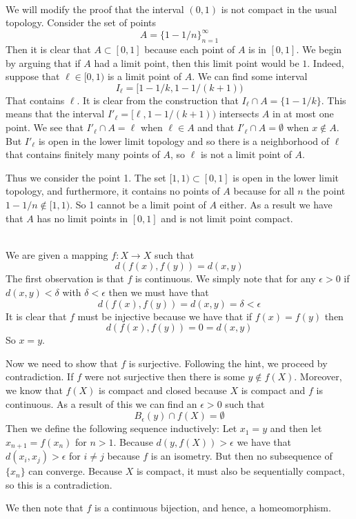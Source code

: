 \documentclass{article}
\newcommand{\problem}[1]{\noindent{\textbf{Problem #1}}\\}
\begin{document}
\problem{3.28.2}
We will modify the proof that the interval $(0,1)$ is not compact in the usual topology. Consider the set of points 
\[
A = \{1 - 1/n\}_{n=1}^\infty
\]
Then it is clear that $A \subset [0,1]$ because each point of $A$ is in $[0,1]$. We begin by arguing that if $A$ had a limit point, then this limit point would be $1$. Indeed, suppose that $\ell \in [0,1)$ is a limit point of $A$. We can find some interval 
\[
I_\ell = [1-1/k, 1-1/(k+1))
\]
That contains $\ell$. It is clear from the construction that $I_\ell \cap A = \{1-1/k\}$. This means that the interval $I'_\ell = [\ell, 1-1/(k+1))$ intersects $A$ in at most one point. We see that $I'_\ell \cap A = \ell$ when $\ell \in A$ and that $I'_\ell \cap A = \emptyset$ when $x\not\in A$. But $I'_\ell$ is open in the lower limit topology and so there is a neighborhood of $\ell$ that contains finitely many points of $A$, so $\ell$ is not a limit point of $A$. 

Thus we consider the point 1. The set $[1,1) \subset [0,1]$ is open in the lower limit topology, and furthermore, it contains no points of $A$ because for all $n$ the point $1-1/n \not\in [1,1)$. So 1 cannot be a limit point of $A$ either. As a result we have that $A$ has no limit points in $[0,1]$ and is not limit point compact. 

\problem{3.28.6}
We are given a mapping $f: X \to X$ such that
\[
d(f(x), f(y)) = d(x,y)
\]
The first observation is that $f$ is continuous. We simply note that for any $\epsilon > 0$ if $d(x,y) < \delta$ with $\delta < \epsilon$ then we must have that
\[
d(f(x), f(y)) = d(x,y) = \delta < \epsilon
\] 
It is clear that $f$ must be injective because we have that if $f(x) = f(y)$ then 
\[
d(f(x), f(y)) = 0 = d(x,y)
\]
So $x = y$. 

Now we need to show that $f$ is surjective. Following the hint, we proceed by contradiction. If $f$ were not surjective then there is some $y \not\in f(X)$. Moreover, we know that $f(X)$ is compact and closed because $X$ is compact and $f$ is continuous. As a result of this we can find an $\epsilon > 0$ such that 
\[
B_\epsilon(y) \cap f(X) = \emptyset
\]
Then we define the following sequence inductively: Let $x_1 = y$ and then let $x_{n+1} = f(x_n)$ for $n > 1$. Because $d(y, f(X)) > \epsilon$ we have that $d(x_i, x_j) > \epsilon$ for $i \neq j$ because $f$ is an isometry. But then no subsequence of $\{x_n\}$ can converge. Because $X$ is compact, it must also be sequentially compact, so this is a contradiction. 

We then note that $f$ is a continuous bijection, and hence, a homeomorphism. 
\end{document}
